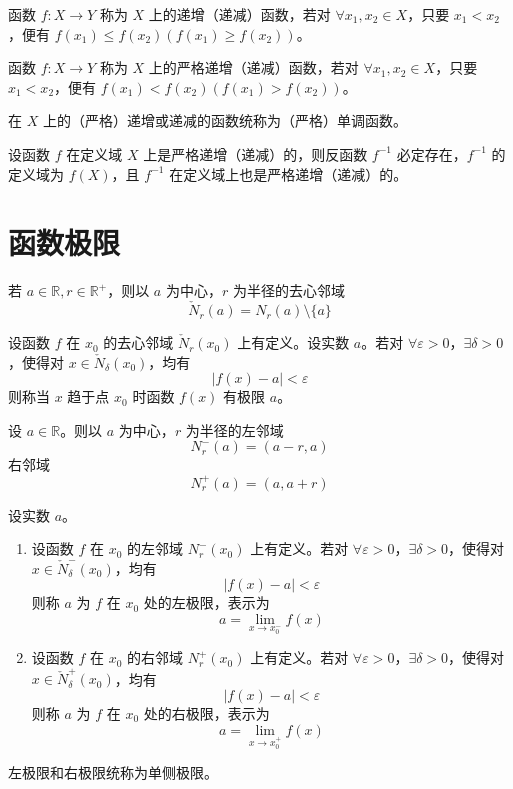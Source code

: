 \begin{definition}
    函数 $f: X \to Y$ 称为 $X$ 上的递增（递减）函数，若对 $\forall x_1, x_2 \in X$，只要 $x_1 < x_2$，便有 $f(x_1) \leqslant f(x_2)(f(x_1) \geqslant f(x_2))$。

    函数 $f: X \to Y$ 称为 $X$ 上的严格递增（递减）函数，若对 $\forall x_1, x_2 \in X$，只要 $x_1 < x_2$，便有 $f(x_1) < f(x_2)(f(x_1) > f(x_2))$。

    在 $X$ 上的（严格）递增或递减的函数统称为（严格）单调函数。
\end{definition}

\begin{theorem}
    设函数 $f$ 在定义域 $X$ 上是严格递增（递减）的，则反函数 $f^{-1}$ 必定存在，$f^{-1}$ 的定义域为 $f(X)$，且 $f^{-1}$ 在定义域上也是严格递增（递减）的。
\end{theorem}



\section{函数极限}

\begin{definition}
    若 $a \in \mathbb{R}, r \in \mathbb{R}^{+}$，则以 $a$ 为中心，$r$ 为半径的去心邻域
    \[\check{N}_{r}(a) = N_{r}(a)\setminus \{ a \}\]
\end{definition}

\begin{definition}
    设函数 $f$ 在 $x_0$ 的去心邻域 $\check{N}_{r}(x_0)$ 上有定义。设实数 $a$。若对 $\forall \varepsilon > 0$，$\exists \delta > 0$，使得对 $x \in \check{N}_{\delta}(x_0)$，均有
    \[|f(x) - a| < \varepsilon\]
    则称当 $x$ 趋于点 $x_0$ 时函数 $f(x)$ 有极限 $a$。
\end{definition}

\begin{definition}
    设 $a \in \mathbb{R}$。则以 $a$ 为中心，$r$ 为半径的左邻域
    \[N_{r}^{-}(a) = (a - r, a)\]
    右邻域
    \[N_{r}^{+}(a) = (a, a + r)\]
\end{definition}

\begin{definition}
    设实数 $a$。
    \begin{enumerate}
        \item 设函数 $f$ 在 $x_0$ 的左邻域 $N_{r}^{-}(x_0)$ 上有定义。若对 $\forall \varepsilon > 0$，$\exists \delta > 0$，使得对 $x \in \check{N}_{\delta}^{-}(x_0)$，均有
              \[|f(x) - a| < \varepsilon\]
              则称 $a$ 为 $f$ 在 $x_0$ 处的左极限，表示为
              \[a = \lim_{x \to x_{0}^{-}}f(x)\]
        \item 设函数 $f$ 在 $x_0$ 的右邻域 $N_{r}^{+}(x_0)$ 上有定义。若对 $\forall \varepsilon > 0$，$\exists \delta > 0$，使得对 $x \in \check{N}_{\delta}^{+}(x_0)$，均有
              \[|f(x) - a| < \varepsilon\]
              则称 $a$ 为 $f$ 在 $x_0$ 处的右极限，表示为
              \[a = \lim_{x \to x_{0}^{+}}f(x)\]
    \end{enumerate}
    左极限和右极限统称为单侧极限。
\end{definition}

